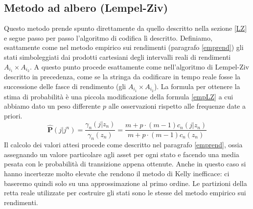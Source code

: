 \documentclass[a4paper,11pt]{book}
\theoremstyle{plain}
\theoremstyle{definition}
\theoremstyle{remark}
\newcommand{\Ph}{\hat{\mathbf{P}}}
\begin{document}
\subsection{Metodo ad albero (Lempel-Ziv)}
Questo metodo prende spunto direttamente da quello descritto nella sezione \ref{LZ} e segue passo per passo l'algoritmo di codifica lì descritto. \newline
Definiamo, esattamente come nel metodo empirico sui rendimenti (paragrafo \ref{emprend}) gli stati simboleggiati dai prodotti cartesiani degli intervalli reali di rendimenti $A_{i_1}\times A_{i_2}$. A questo punto procede esattamente come nell'algoritmo di Lempel-Ziv descritto in precedenza, come se la stringa da codificare in tempo reale fosse la successione delle fasce di rendimento (gli $A_{i_1}\times A_{i_2}$).\newline
La formula per ottenere la stima di probabilità è una piccola modificazione della formula \ref{empLZ} a cui abbiamo dato un peso differente $p$ alle osservazioni rispetto alle frequenze date a priori. 
\begin{equation*}
\Ph(j|j^n) = \frac{\gamma_n(j|z_n)}{\gamma_n(z_n)}=\frac{m+p\cdot (m-1)c_n(j|z_n)}{m+p\cdot (m-1)c_n(z_n)}
\end{equation*}
Il calcolo dei valori attesi procede come descritto nel paragrafo \ref{emprend}, ossia assegnando un valore particolare agli asset per ogni stato e facendo una media pesata con le probabilità di transizione appena ottenute.\newline
Anche in questo caso si hanno incertezze molto elevate che rendono il metodo di Kelly inefficace: ci baseremo quindi solo su una approssimazione al primo ordine.\newline
Le partizioni della retta reale utilizzate per costruire gli stati sono le stesse del metodo empirico sui rendimenti.
\end{document}
